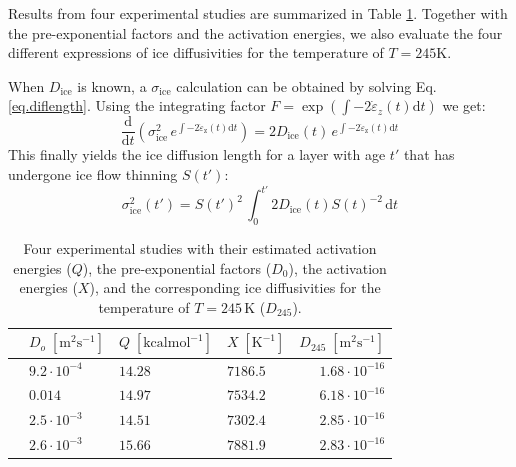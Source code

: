 \documentclass[11pt, draftcls, onecolumn]{IEEEtran} %
\numberwithin{equation}{section}
\numberwithin{table}{section}
\numberwithin{figure}{section}
\begin{document}
\begin{appendices}
Results from four experimental studies are summarized in Table \ref{table_ice_diffusivities}. Together with 
the pre-exponential factors  and the activation energies, we also evaluate the four different expressions 
of ice diffusivities for the temperature of $T = 245 \mathrm{K}$.

When $D_{\mathrm{ice}}$ is known, a $\sigma_{\mathrm{ice}}$ calculation can be obtained by solving Eq. \ref{eq.diflength}.
Using the integrating factor $F = \exp \left( \int -2 \dot{\varepsilon}_z\left(t\right)  \mathrm{d} t \right)$ we get:
\begin{equation}
\frac{\mathrm{d}}{\mathrm{d}t} \left( \sigma_{\mathrm{ice}}^2\,e^{\int  -2\dot{\varepsilon}_{\mathrm{z}} \left( t
\right) \mathrm{d} t} \right) = 2 D_{\mathrm{ice}}  \left( t \right) \,e^{\int -2\dot{\varepsilon}_{\mathrm{z}} \left( t \right) \mathrm{d} t}
\label{eq38_ch4}
\end{equation}
This finally yields the ice diffusion length for a layer with age $t'$ that has undergone 
ice flow thinning $S(t')$:
\begin{equation}
\sigma_{\mathrm{ice}}^2 \left( t' \right) = 
{S \left( t' \right)}^{2} \,\int_0^{t'} 2 D_{\mathrm{ice}} \left( t \right) S \left( t \right) ^{-2} \,\mathrm{d} t
\label{eq39_ch4}
\end{equation}

\begin{table}[h]
\center
	\caption{Four experimental studies with their estimated activation energies ($Q$), 
		the pre-exponential factors ($D_0$), the activation energies ($X$), 
		and the corresponding ice diffusivities for the temperature of $T = 245 \,\mathrm{K}$ ($D_{245}$).}
	\label{table_ice_diffusivities}
	\begin{tabular}{l l l l r } 
		\toprule
		& $D_o \; [\mathrm{m^2s^{-1}}]$  &  $Q\; [\mathrm{kcalmol^{-1}}]$ & $X \; [\mathrm{K^{-1}}]$& $D_{245}\;  [\mathrm{m^2s^{-1}}]$\\
		\midrule
		\cite{Ramseier1967}& $9.2\cdot10^{-4}$  &  $  14.28 $ & $ 7186.5 $& $1.68 \cdot 10^{-16}$\\
		\cite{Itagaki1964}& $ 0.014 $  &  $  14.97 $ & $ 7534.2 $& $6.18 \cdot 10^{-16}$\\
		\cite{Blicks1966}& $ 2.5\cdot10^{-3} $  &  $  14.51 $ & $ 7302.4 $& $2.85 \cdot 10^{-16}$\\
		\cite{Delibaltas1966}& $ 2.6\cdot10^{-3} $  &  $  15.66 $ & $ 7881.9 $& $2.83 \cdot 10^{-16}$\\
		\bottomrule		
	\end{tabular}
\end{table}





\end{appendices}
\end{document}
